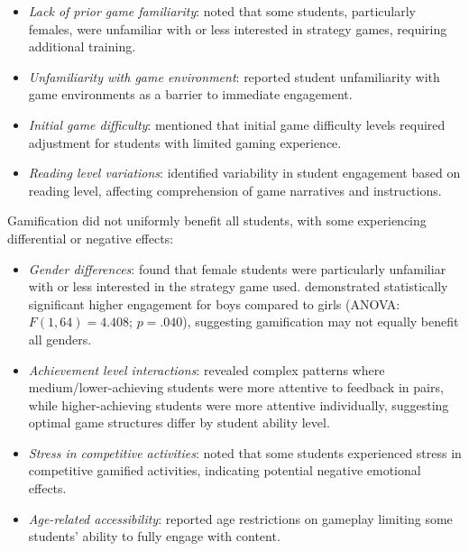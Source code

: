 \documentclass[a4paper,fleqn]{cas-sc}
\begin{document}
\begin{itemize}[noitemsep]
 \item \textit{Lack of prior game familiarity}: \citet{3Watson2011466, 8Yu2014} noted that some students, particularly females, were unfamiliar with or less interested in strategy games, requiring additional training.
 
 \item \textit{Unfamiliarity with game environment}: \citet{77Ramansyah2021} reported student unfamiliarity with game environments as a barrier to immediate engagement.
 
 \item \textit{Initial game difficulty}: \citet{8Yu2014} mentioned that initial game difficulty levels required adjustment for students with limited gaming experience.
 
 \item \textit{Reading level variations}: \citet{15Slater2022} identified variability in student engagement based on reading level, affecting comprehension of game narratives and instructions.
 
\end{itemize}


Gamification did not uniformly benefit all students, with some experiencing differential or negative effects:

\begin{itemize}[noitemsep]
 \item \textit{Gender differences}: \citet{8Yu2014} found that female students were particularly unfamiliar with or less interested in the strategy game used. \citet{66Rahmawati2023163} demonstrated statistically significant higher engagement for boys compared to girls (ANOVA: $F(1,64)=4.408$; $p=.040$), suggesting gamification may not equally benefit all genders.
 
 \item \textit{Achievement level interactions}: \citet{11Ternblad2023115} revealed complex patterns where medium/lower-achieving students were more attentive to feedback in pairs, while higher-achieving students were more attentive individually, suggesting optimal game structures differ by student ability level.
 
 \item \textit{Stress in competitive activities}: \citet{34Serrano2023} noted that some students experienced stress in competitive gamified activities, indicating potential negative emotional effects.
 
 \item \textit{Age-related accessibility}: \citet{72hutauruk2020utilization} reported age restrictions on gameplay limiting some students' ability to fully engage with content.
\end{itemize}
\end{document}
